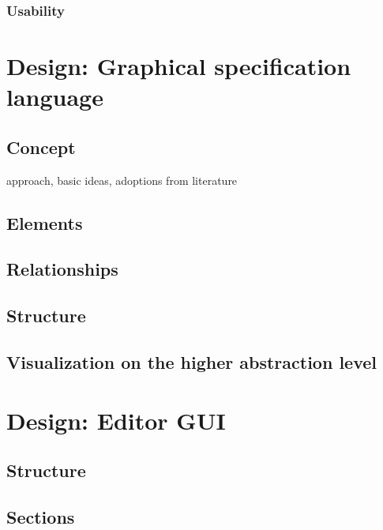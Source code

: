 \documentclass[twoside, openright, 12pt]{book}
\begin{document}
\subsection{Usability}
\label{usability}




\cleardoublepage
\chapter{Design: Graphical specification language}
\label{gsl_design}


\section{Concept}
\label{gsl_concept}
approach, basic ideas, adoptions from literature

\section{Elements}
\label{gsl_elements}


\section{Relationships}
\label{gsl_relationships}


\section{Structure}
\label{gsl_structure}


\section{Visualization on the higher abstraction level}
\label{higher_abstraction_level}




\cleardoublepage
\chapter{Design: Editor GUI}
\label{editor_design}


\section{Structure}
\label{editor_structure}


\section{Sections}
\label{editor_sections}
\end{document}
